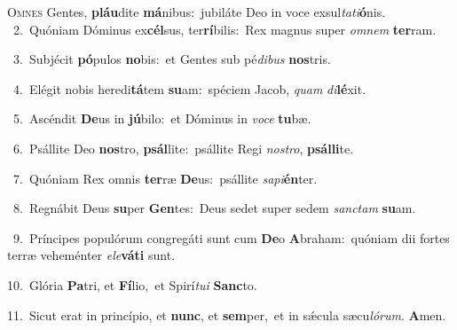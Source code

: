 \lettrine{\initial\textcolor{\initialcolor}{O}}{mnes} Gentes, \textbf{pláu}\-dite \textbf{má}\-nibus:~\star jubiláte Deo in voce exsul\-\textit{ta}\-\textit{ti}\textbf{ó}nis.\\
{\numbfont\textcolor{\numbcolor}{~2.}}~Quóniam Dóminus ex\-\textbf{cél}\-sus, ter\-\textbf{rí}\-bilis:~\star Rex magnus super \textit{om}\-\textit{nem} \textbf{ter}\-ram.\par
{\numbfont\textcolor{\numbcolor}{~3.}}~Subjécit \textbf{pó}\-pulos \textbf{no}\-bis:~\star et Gentes sub pé\-\textit{di}\-\textit{bus} \textbf{nos}\-tris.\par
{\numbfont\textcolor{\numbcolor}{~4.}}~Elégit nobis heredi\-\textbf{tá}\-tem \textbf{su}\-am:~\star spéciem Jacob, \textit{quam} \textit{di}\-\textbf{lé}xit.\par
{\numbfont\textcolor{\numbcolor}{~5.}}~Ascéndit \textbf{De}\-us in \textbf{jú}\-bilo:~\star et Dóminus in \textit{vo}\-\textit{ce} \textbf{tu}\-bæ.\par
{\numbfont\textcolor{\numbcolor}{~6.}}~Psállite Deo \textbf{nos}\-tro, \textbf{psál}\-lite:~\star psállite Regi \textit{nos}\-\textit{tro}, \textbf{psál}\-\textbf{li}te.\par
{\numbfont\textcolor{\numbcolor}{~7.}}~Quóniam Rex omnis \textbf{ter}\-ræ \textbf{De}\-us:~\star psállite \textit{sa}\-\textit{pi}\textbf{én}ter.\par
{\numbfont\textcolor{\numbcolor}{~8.}}~Regnábit Deus \textbf{su}\-per \textbf{Gen}\-tes:~\star Deus sedet super sedem \textit{sanc}\-\textit{tam} \textbf{su}\-am.\par
{\numbfont\textcolor{\numbcolor}{~9.}}~Príncipes populórum congregáti sunt cum \textbf{De}\-o \textbf{A}\-braham:~\star quóniam dii fortes terræ veheménter \textit{e}\-\textit{le}\textbf{vá}\textbf{ti} sunt.\par
{\numbfont\textcolor{\numbcolor}{10.}}~Glória \textbf{Pa}\-tri, et \textbf{Fí}\-lio,~\star et Spirí\-\textit{tu}\-\textit{i} \textbf{Sanc}\-to.\par
{\numbfont\textcolor{\numbcolor}{11.}}~Sicut erat in princípio, et \textbf{nunc}\-, et \textbf{sem}\-per,~\star et in sǽcula sæcu\-\textit{ló}\-\textit{rum}. \textbf{A}\-men.\par

